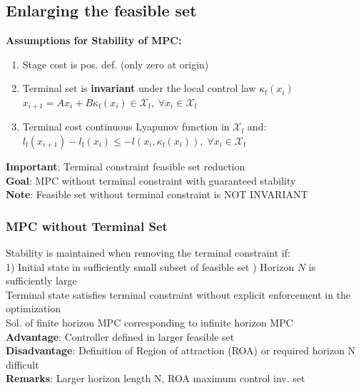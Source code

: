 \subsection{Enlarging the feasible set}
\textbf{Assumptions for Stability of MPC:}\\
\begin{enumerate}
    \item Stage cost is pos. def. (only zero at origin)
    \item Terminal set is \textbf{invariant} under the local control law $\kappa_\text{f}(x_i)$\Rightarrow $x_{i+1}=Ax_i+B\kappa_\text{f}(x_i)\in\mathcal{X}_\text{f},\; \forall x_i\in\mathcal{X}_\text{f}$
    \item Terminal cost continuous Lyapunov function in $\mathcal{X}_\text{f}$ and: $l_\text{f}(x_{i+1})-l_\text{f}(x_i)\leq -l(x_i,\kappa_\text{f}(x_i)),\;\forall x_i\in\mathcal{X}_\text{f}$
\end{enumerate}
\textbf{Important}: Terminal constraint \rightarrow feasible set reduction\\
\textbf{Goal}: MPC without terminal constraint with guaranteed stability\\
\textbf{Note}: Feasible set without terminal constraint is NOT INVARIANT

\subsubsection{MPC without Terminal Set}
    Stability is maintained when removing the terminal constraint if:\\
    1) Initial state in sufficiently small subset of feasible set ) Horizon $N$ is sufficiently large\\
    \Rightarrow Terminal state satisfies terminal constraint without explicit enforcement in the optimization\\
    \Rightarrow Sol. of finite horizon MPC corresponding to infinite horizon MPC\\
    \textbf{Advantage}: Controller defined in larger feasible set\\
    \textbf{Disadvantage}: Definition of Region of attraction (ROA) or required horizon N difficult \\
    \textbf{Remarks}: Larger horizon length N, ROA \rightarrow maximum control inv. set


    
